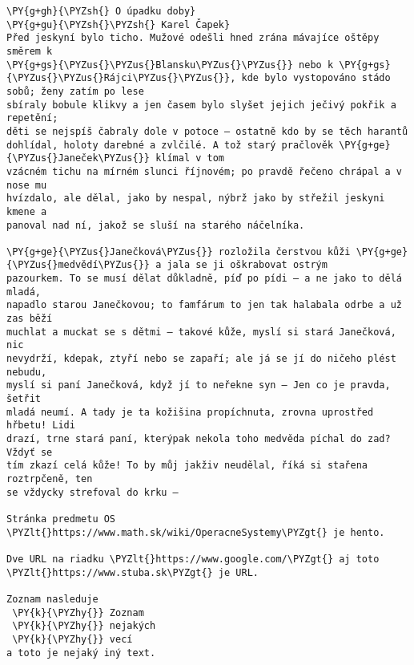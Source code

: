 \begin{Verbatim}[commandchars=\\\{\}]
\PY{g+gh}{\PYZsh{} O úpadku doby}
\PY{g+gu}{\PYZsh{}\PYZsh{} Karel Čapek}
Před jeskyní bylo ticho. Mužové odešli hned zrána mávajíce oštěpy směrem k
\PY{g+gs}{\PYZus{}\PYZus{}Blansku\PYZus{}\PYZus{}} nebo k \PY{g+gs}{\PYZus{}\PYZus{}Rájci\PYZus{}\PYZus{}}, kde bylo vystopováno stádo sobů; ženy zatím po lese
sbíraly bobule klikvy a jen časem bylo slyšet jejich ječivý pokřik a repetění;
děti se nejspíš čabraly dole v potoce – ostatně kdo by se těch harantů
dohlídal, holoty darebné a zvlčilé. A tož starý pračlověk \PY{g+ge}{\PYZus{}Janeček\PYZus{}} klímal v tom
vzácném tichu na mírném slunci říjnovém; po pravdě řečeno chrápal a v nose mu
hvízdalo, ale dělal, jako by nespal, nýbrž jako by střežil jeskyni kmene a
panoval nad ní, jakož se sluší na starého náčelníka.

\PY{g+ge}{\PYZus{}Janečková\PYZus{}} rozložila čerstvou kůži \PY{g+ge}{\PYZus{}medvědí\PYZus{}} a jala se ji oškrabovat ostrým
pazourkem. To se musí dělat důkladně, píď po pídi – a ne jako to dělá mladá,
napadlo starou Janečkovou; to famfárum to jen tak halabala odrbe a už zas běží
muchlat a muckat se s dětmi – takové kůže, myslí si stará Janečková, nic
nevydrží, kdepak, ztyří nebo se zapaří; ale já se jí do ničeho plést nebudu,
myslí si paní Janečková, když jí to neřekne syn – Jen co je pravda, šetřit
mladá neumí. A tady je ta kožišina propíchnuta, zrovna uprostřed hřbetu! Lidi
drazí, trne stará paní, kterýpak nekola toho medvěda píchal do zad? Vždyť se
tím zkazí celá kůže! To by můj jakživ neudělal, říká si stařena roztrpčeně, ten
se vždycky strefoval do krku – 

Stránka predmetu OS \PYZlt{}https://www.math.sk/wiki/OperacneSystemy\PYZgt{} je hento.

Dve URL na riadku \PYZlt{}https://www.google.com/\PYZgt{} aj toto \PYZlt{}https://www.stuba.sk\PYZgt{} je URL.

Zoznam nasleduje
 \PY{k}{\PYZhy{}} Zoznam
 \PY{k}{\PYZhy{}} nejakých
 \PY{k}{\PYZhy{}} vecí
a toto je nejaký iný text.
\end{Verbatim}
